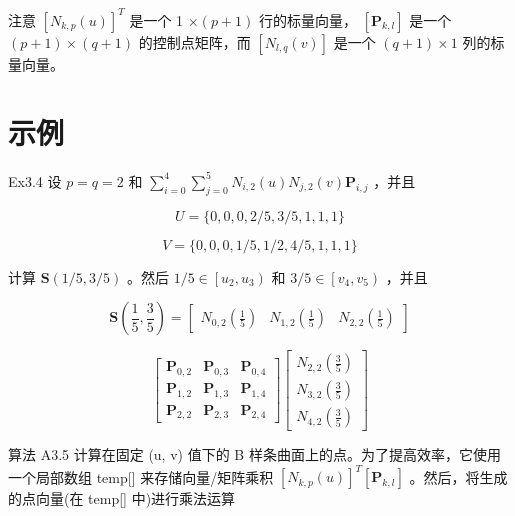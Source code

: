 \documentclass[../main.tex]{subfiles}
\begin{document}
注意 \({\left\lbrack  {N}_{k,p}\left( u\right) \right\rbrack  }^{T}\) 是一个 1 \(\times  \left( {p + 1}\right)\) 行的标量向量， \(\left\lbrack  {\mathbf{P}}_{k,l}\right\rbrack\) 是一个 \(\left( {p + 1}\right)  \times  \left( {q + 1}\right)\) 的控制点矩阵，而 \(\left\lbrack  {{N}_{l,q}\left( v\right) }\right\rbrack\) 是一个 \(\left( {q + 1}\right)  \times  1\) 列的标量向量。

\section*{示例}

Ex3.4 设 \(p = q = 2\) 和 \(\mathop{\sum }\limits_{{i = 0}}^{4}\mathop{\sum }\limits_{{j = 0}}^{5}{N}_{i,2}\left( u\right) {N}_{j,2}\left( v\right) {\mathbf{P}}_{i,j}\) ，并且

\[
U = \{ 0,0,0,2/5,3/5,1,1,1\}
\]

\[
V = \{ 0,0,0,1/5,1/2,4/5,1,1,1\}
\]

计算 \(\mathbf{S}\left( {1/5,3/5}\right)\) 。然后 \(1/5 \in  \left\lbrack  {{u}_{2},{u}_{3}}\right)\) 和 \(3/5 \in  \left\lbrack  {{v}_{4},{v}_{5}}\right)\) ，并且

\[
\mathbf{S}\left( {\frac{1}{5},\frac{3}{5}}\right)  = \left\lbrack  \begin{array}{lll} {N}_{0,2}\left( \frac{1}{5}\right) & {N}_{1,2}\left( \frac{1}{5}\right) & {N}_{2,2}\left( \frac{1}{5}\right)  \end{array}\right\rbrack
\]

\[
\left\lbrack  \begin{array}{lll} {\mathbf{P}}_{0,2} & {\mathbf{P}}_{0,3} & {\mathbf{P}}_{0,4} \\  {\mathbf{P}}_{1,2} & {\mathbf{P}}_{1,3} & {\mathbf{P}}_{1,4} \\  {\mathbf{P}}_{2,2} & {\mathbf{P}}_{2,3} & {\mathbf{P}}_{2,4} \end{array}\right\rbrack  \left\lbrack  \begin{array}{l} {N}_{2,2}\left( \frac{3}{5}\right) \\  {N}_{3,2}\left( \frac{3}{5}\right) \\  {N}_{4,2}\left( \frac{3}{5}\right)  \end{array}\right\rbrack
\]

算法 A3.5 计算在固定 (u, v) 值下的 B 样条曲面上的点。为了提高效率，它使用一个局部数组 temp[] 来存储向量/矩阵乘积 \({\left\lbrack  {N}_{k,p}\left( u\right) \right\rbrack  }^{T}\left\lbrack  {\mathbf{P}}_{k,l}\right\rbrack\) 。然后，将生成的点向量(在 temp[] 中)进行乘法运算
\end{document}
